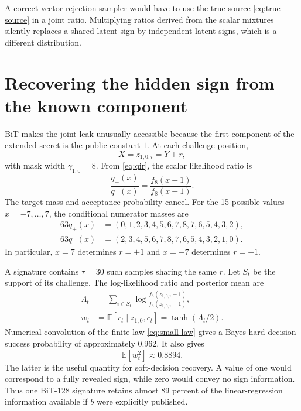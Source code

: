 \documentclass[11pt,a4paper]{article}
\newcommand{\E}{\mathbb{E}}
\begin{document}
A correct vector rejection sampler would have to use the true source
\eqref{eq:true-source} in a joint ratio.  Multiplying ratios derived from the
scalar mixtures silently replaces a shared latent sign by independent latent
signs, which is a different distribution.

\section{Recovering the hidden sign from the known component}

BiT makes the joint leak unusually accessible because the first component of
the extended secret is the public constant $1$.  At each challenge position,
\[
                  X=z_{1,0,i}=Y+r,
\]
with mask width $\gamma_{1,0}=8$.  From \eqref{eq:qir}, the scalar likelihood
ratio is
\begin{equation}
 \frac{q_+(x)}{q_-(x)}
   =\frac{f_8(x-1)}{f_8(x+1)}.
 \label{eq:scalar-llr}
\end{equation}
The target mass and acceptance probability cancel.  For the 15 possible
values $x=-7,\ldots,7$, the conditional numerator masses are
\begin{equation}
\begin{aligned}
 63q_+(x)&=(0,1,2,3,4,5,6,7,8,7,6,5,4,3,2),\\
 63q_-(x)&=(2,3,4,5,6,7,8,7,6,5,4,3,2,1,0).
\end{aligned}
\label{eq:small-law}
\end{equation}
In particular, $x=7$ determines $r=+1$ and $x=-7$ determines $r=-1$.

A signature contains $\tau=30$ such samples sharing the same $r$.  Let $S_t$
be the support of its challenge.  The log-likelihood ratio and posterior mean
are
\begin{align}
 \Lambda_t
   &=\sum_{i\in S_t}
       \log\frac{f_8(z_{1,0,i}-1)}{f_8(z_{1,0,i}+1)},
       \label{eq:llr}\\
 w_t&=\E[r_t\mid z_{1,0},c_t]
       =\tanh(\Lambda_t/2).
       \label{eq:posterior}
\end{align}
Numerical convolution of the finite law \eqref{eq:small-law} gives a Bayes
hard-decision success probability of approximately $0.962$.  It also gives
\begin{equation}
                       \E[w_t^2]\approx0.8894.
 \label{eq:w2}
\end{equation}
The latter is the useful quantity for soft-decision recovery.  A value of one
would correspond to a fully revealed sign, while zero would convey no sign
information.  Thus one BiT-128 signature retains almost 89 percent of the
linear-regression information available if $b$ were explicitly published.
\end{document}
